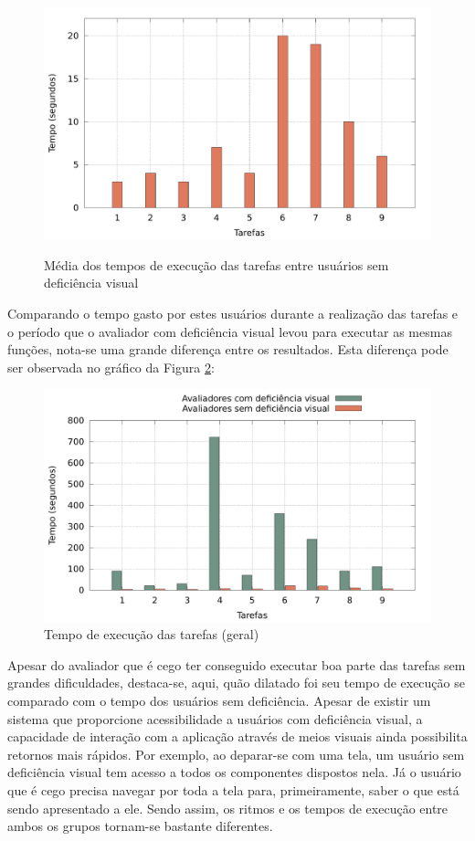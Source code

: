 \begin{figure}[H]
	\centering
	\caption[Tempo de execução -- Usuários sem deficiência visual]{Média dos tempos de execução das tarefas entre usuários sem deficiência visual}
	\includegraphics[width=0.8\linewidth]{./charts/tempo-sem-dv.pdf}
	\label{fig:tempo-sem-dv}
\end{figure}

Comparando o tempo gasto por estes usuários durante a realização das tarefas e o período que o avaliador com deficiência visual levou para executar as mesmas funções, nota-se uma grande diferença entre os resultados. Esta diferença pode ser observada no gráfico da Figura \ref{fig:tempo}:

\begin{figure}[H]
	\centering
	\caption[Tempo de execução -- Geral]{Tempo de execução das tarefas (geral)}
	\label{fig:tempo}
	\includegraphics[width=0.8\linewidth]{./charts/tempo.pdf}
\end{figure}
Apesar do avaliador que é cego ter conseguido executar boa parte das tarefas sem grandes dificuldades, destaca-se, aqui, quão dilatado foi seu tempo de execução se comparado com o tempo dos usuários sem deficiência. Apesar de existir um sistema que proporcione acessibilidade a usuários com deficiência visual, a capacidade de interação com a aplicação através de meios visuais ainda possibilita retornos mais rápidos. Por exemplo, ao deparar-se com uma tela, um usuário sem deficiência visual tem acesso a todos os componentes dispostos nela. Já o usuário que é cego precisa navegar por toda a tela para, primeiramente, saber o que está sendo apresentado a ele. Sendo assim, os ritmos e os tempos de execução entre ambos os grupos tornam-se bastante diferentes.

